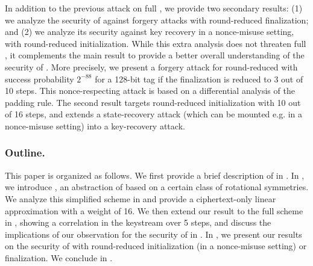 In addition to the previous attack on full \MORUS, we provide two secondary results: (1) we analyze the security of \MORUS against forgery attacks with round-reduced finalization; and (2) we analyze its security against key recovery in a nonce-misuse setting, with round-reduced initialization.
While this extra analysis does not threaten full \MORUS, it complements the main result to provide a better overall understanding of the security of \MORUS.
More precisely, we present a forgery attack for round-reduced \MORUS[1280] with success probability $2^{-88}$ for a 128-bit tag if the finalization is reduced to 3 out of 10 steps. This nonce-respecting attack is based on a differential analysis of the padding rule.
The second result targets round-reduced initialization with 10 out of 16 steps, and extends a state-recovery attack (which can be mounted e.g. in a nonce-misuse setting) into a key-recovery attack.

\subsubsection*{Outline.}
This paper is organized as follows.
We first provide a brief description of \MORUS in .
In , we introduce \MiniMORUS, an abstraction of \MORUS based on a certain class of rotational symmetries.
We analyze this simplified scheme in  and provide a ciphertext-only linear approximation with a weight of 16.
We then extend our result to the full scheme in , showing a correlation in the keystream over 5 steps,
and discuss the implications of our observation for the security of \MORUS in .
In , we present our results on the security of \MORUS with round-reduced initialization (in a nonce-misuse setting) or finalization.
We conclude in .

